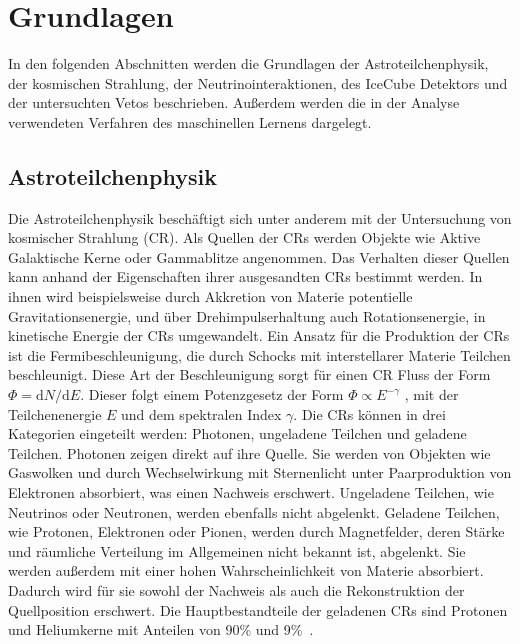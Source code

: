 



\chapter{Grundlagen}
In den folgenden Abschnitten werden die Grundlagen der Astroteilchenphysik, der kosmischen Strahlung, der Neutrinointeraktionen, des IceCube Detektors und der untersuchten Vetos beschrieben. 
Außerdem werden die in der Analyse verwendeten Verfahren des maschinellen Lernens dargelegt.

\section{Astroteilchenphysik}\label{astro}
Die Astroteilchenphysik beschäftigt sich unter anderem mit der Untersuchung von kosmischer Strahlung (CR).
Als Quellen der CRs werden Objekte wie Aktive Galaktische Kerne oder Gammablitze angenommen.
Das Verhalten dieser Quellen kann anhand der Eigenschaften ihrer ausgesandten CRs bestimmt werden.
In ihnen wird beispielsweise durch Akkretion von Materie potentielle Gravitationsenergie, und über Drehimpulserhaltung auch Rotationsenergie, in kinetische Energie der CRs umgewandelt. 
Ein Ansatz für die Produktion der CRs ist die Fermibeschleunigung, die durch Schocks mit interstellarer Materie Teilchen beschleunigt.
Diese Art der Beschleunigung sorgt für einen CR Fluss der Form $Φ = \mathrm{d}N / \mathrm{d}E $.
Dieser folgt einem Potenzgesetz der Form $Φ \propto E^{-γ}$ \cite{FermiAcc}, mit der Teilchenenergie $E$ und dem spektralen Index $γ$.
Die CRs können in drei Kategorien eingeteilt werden: Photonen, ungeladene Teilchen und geladene Teilchen.
Photonen zeigen direkt auf ihre Quelle.
Sie werden von Objekten wie Gaswolken und durch Wechselwirkung mit Sternenlicht unter Paarproduktion von Elektronen absorbiert, was einen Nachweis erschwert.
Ungeladene Teilchen, wie Neutrinos oder Neutronen, werden ebenfalls nicht abgelenkt. 
Geladene Teilchen, wie Protonen, Elektronen oder Pionen, werden durch Magnetfelder, deren Stärke und räumliche Verteilung im Allgemeinen nicht bekannt ist, abgelenkt. 
Sie werden außerdem mit einer hohen Wahrscheinlichkeit von Materie absorbiert. 
Dadurch wird für sie sowohl der Nachweis als auch die Rekonstruktion der Quellposition erschwert.
Die Hauptbestandteile der geladenen CRs sind Protonen und Heliumkerne mit Anteilen von 90\% und 9\%~\cite{gaisser2016cosmic}.
\cite{highenergyastro} 


